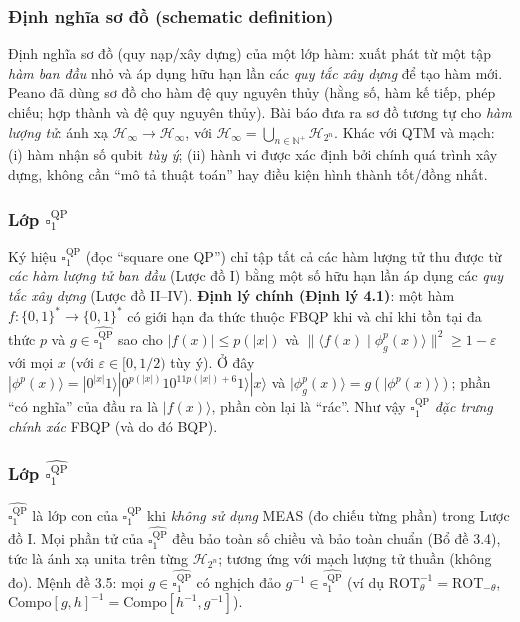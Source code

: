 \documentclass[10pt]{article}
\begin{document}
\subsubsection*{Định nghĩa sơ đồ (schematic definition)}
Định nghĩa sơ đồ (quy nạp/xây dựng) của một lớp hàm: xuất phát từ một tập \emph{hàm ban đầu} nhỏ và áp dụng hữu hạn lần các \emph{quy tắc xây dựng} để tạo hàm mới. Peano đã dùng sơ đồ cho hàm đệ quy nguyên thủy (hằng số, hàm kế tiếp, phép chiếu; hợp thành và đệ quy nguyên thủy). Bài báo đưa ra sơ đồ tương tự cho \emph{hàm lượng tử}: ánh xạ $\mathcal{H}_\infty\to\mathcal{H}_\infty$, với $\mathcal{H}_\infty=\bigcup_{n\in\mathbb{N}^+}\mathcal{H}_{2^n}$. Khác với QTM và mạch: (i) hàm nhận số qubit \emph{tùy ý}; (ii) hành vi được xác định bởi chính quá trình xây dựng, không cần ``mô tả thuật toán'' hay điều kiện hình thành tốt/đồng nhất.

\subsubsection*{Lớp $\square_1^{\mathrm{QP}}$}
Ký hiệu $\square_1^{\mathrm{QP}}$ (đọc ``square one QP'') chỉ tập tất cả các hàm lượng tử thu được từ \emph{các hàm lượng tử ban đầu} (Lược đồ I) bằng một số hữu hạn lần áp dụng các \emph{quy tắc xây dựng} (Lược đồ II--IV). \textbf{Định lý chính (Định lý 4.1)}: một hàm $f:\{0,1\}^*\to\{0,1\}^*$ có giới hạn đa thức thuộc FBQP khi và chỉ khi tồn tại đa thức $p$ và $g\in\widehat{\square_1^{\mathrm{QP}}}$ sao cho $|f(x)|\le p(|x|)$ và $\|\langle f(x)\mid\phi_g^p(x)\rangle\|^2\ge 1-\varepsilon$ với mọi $x$ (với $\varepsilon\in[0,1/2)$ tùy ý). Ở đây $|\phi^p(x)\rangle=|0^{|x|}1\rangle|0^{p(|x|)}10^{11p(|x|)+6}1\rangle|x\rangle$ và $|\phi_g^p(x)\rangle=g(|\phi^p(x)\rangle)$; phần ``có nghĩa'' của đầu ra là $|f(x)\rangle$, phần còn lại là ``rác''. Như vậy $\square_1^{\mathrm{QP}}$ \emph{đặc trưng chính xác} FBQP (và do đó BQP).

\subsubsection*{Lớp $\widehat{\square_1^{\mathrm{QP}}}$}
$\widehat{\square_1^{\mathrm{QP}}}$ là lớp con của $\square_1^{\mathrm{QP}}$ khi \emph{không sử dụng} MEAS (đo chiếu từng phần) trong Lược đồ I. Mọi phần tử của $\widehat{\square_1^{\mathrm{QP}}}$ đều bảo toàn số chiều và bảo toàn chuẩn (Bổ đề 3.4), tức là ánh xạ unita trên từng $\mathcal{H}_{2^n}$; tương ứng với mạch lượng tử thuần (không đo). Mệnh đề 3.5: mọi $g\in\widehat{\square_1^{\mathrm{QP}}}$ có nghịch đảo $g^{-1}\in\widehat{\square_1^{\mathrm{QP}}}$ (ví dụ $\mathrm{ROT}_\theta^{-1}=\mathrm{ROT}_{-\theta}$, $\mathrm{Compo}[g,h]^{-1}=\mathrm{Compo}[h^{-1},g^{-1}]$).
\end{document}
